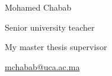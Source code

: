 \begin{Parallel}[v]{0.48\textwidth}{0.48\textwidth}
{\begin{cvhonors}
     
                 \cvhonor
    {Mohamed Chabab} %
    {
    	\begin{cvitems} %
    		\item {}
    		\item {Senior university teacher}
    		\item {My master thesis supervisor}
    		\item { \href{mailto:mchabab@uca.ac.ma}{ mchabab@uca.ac.ma \faEnvelope} }
    \end{cvitems}}
    { }
    {} %

    
    
%     
    

\end{cvhonors}
}
\ParallelPar
\end{Parallel}
